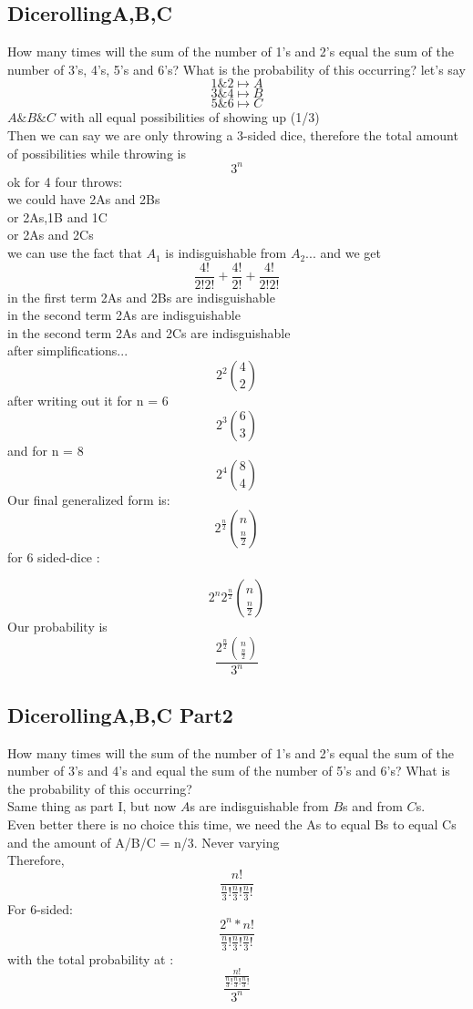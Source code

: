 \documentclass[a4paper,12pt]{article}
\begin{document}
\subsection{DicerollingA,B,C}
How many times will the sum of the number of 1's and 2's equal the
sum of the number of 3's, 4's, 5's and 6's?  What is the probability
of this occurring?
let's say\\
\[ 1 \& 2 \mapsto A\]
\[ 3 \& 4 \mapsto B\]
\[ 5 \& 6 \mapsto C\]
$A \& B \& C$ with all equal possibilities of showing up (1/3)\\
Then we can say we are only throwing a 3-sided dice, therefore the total amount of possibilities while throwing is\\
\[3^n\]
ok for 4 four throws:\\
we could have 2As and 2Bs\\
or 2As,1B and 1C\\
or 2As and 2Cs\\
we can use the fact that $A_{1}$ is indisguishable from $A_{2}$...
and we get 
  \[ \frac{4!}{2!2!} + \frac{4!}{2!} + \frac{4!}{2!2!} \]
  in the first term 2As and 2Bs are indisguishable\\
  in the second term 2As are indisguishable\\
  in the second term 2As and 2Cs are indisguishable\\
  after simplifications...\\
  \[ 2^2 \binom{4}{2} \]
  after writing out it for n = 6
  \[ 2^3 \binom{6}{3} \]
  and for n = 8
  \[ 2^4 \binom{8}{4} \]
  Our final generalized form is:
  \[ 2^{\frac{n}{2}} \binom{n}{\frac{n}{2}} \]
  for 6 sided-dice :

  \[ 2^n 2^{\frac{n}{2}} \binom{n}{\frac{n}{2}} \]
  Our probability is 
  \[ \frac {2^{\frac{n}{2}} \binom{n}{\frac{n}{2}}}{3^n} \]
\subsection{DicerollingA,B,C Part2}
How many times will the sum of the number of 1's and 2's equal the
sum of the number of 3's and 4's and equal the sum of the number of
5's and 6's?  What is the probability of this occurring?\\
Same thing as part I, but now $A$s are indisguishable from $B$s and from $C$s.\\
Even better there is no choice this time, we need the As to equal Bs to equal Cs and the amount of A/B/C = n/3. Never varying\\
Therefore,
  \[\frac{n!}{\frac{n}{3}!\frac{n}{3}!\frac{n}{3}!}\]
For 6-sided:
  \[\frac{2^n * n!}{\frac{n}{3}!\frac{n}{3}!\frac{n}{3}!}\]
  with the total probability at :\\
  \[ \frac {\frac{n!}{\frac{n}{3}!\frac{n}{3}!\frac{n}{3}!}} {3^{n}}\]
\end{document}
